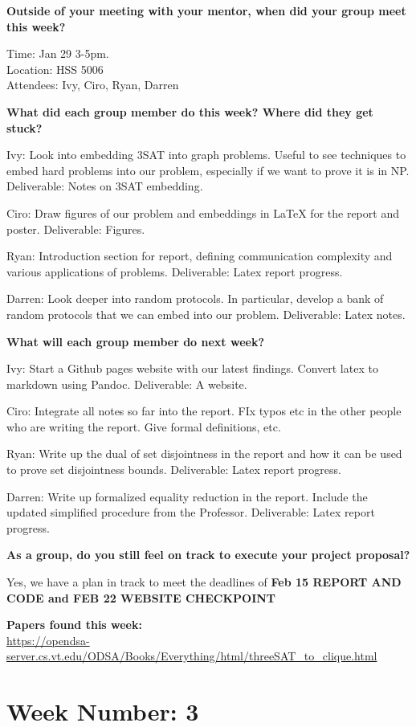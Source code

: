 \textbf{Outside of your meeting with your mentor, when did your group
meet this week?}

Time: Jan 29 3-5pm.\\
Location: HSS 5006\\
Attendees: Ivy, Ciro, Ryan, Darren

\textbf{What did each group member do this week? Where did they get
stuck?}

Ivy: Look into embedding 3SAT into graph problems. Useful to see
techniques to embed hard problems into our problem, especially if we
want to prove it is in NP. Deliverable: Notes on 3SAT embedding.

Ciro: Draw figures of our problem and embeddings in LaTeX for the report
and poster. Deliverable: Figures.

Ryan: Introduction section for report, defining communication complexity
and various applications of problems. Deliverable: Latex report
progress.

Darren: Look deeper into random protocols. In particular, develop a bank
of random protocols that we can embed into our problem. Deliverable:
Latex notes.

\textbf{What will each group member do next week?}

Ivy: Start a Github pages website with our latest findings. Convert
latex to markdown using Pandoc. Deliverable: A website.

Ciro: Integrate all notes so far into the report. FIx typos etc in the
other people who are writing the report. Give formal definitions, etc.

Ryan: Write up the dual of set disjointness in the report and how it can
be used to prove set disjointness bounds. Deliverable: Latex report
progress.

Darren: Write up formalized equality reduction in the report. Include
the updated simplified procedure from the Professor. Deliverable: Latex
report progress.

\textbf{As a group, do you still feel on track to execute your project
proposal?}

Yes, we have a plan in track to meet the deadlines of \textbf{Feb 15
REPORT AND CODE and FEB 22 WEBSITE CHECKPOINT}

\textbf{Papers found this week:}\\
\url{https://opendsa-server.cs.vt.edu/ODSA/Books/Everything/html/threeSAT_to_clique.html}

\section{\texorpdfstring{\textbf{Week Number:
3}}{Week Number: 3}}\label{week-number-3}

